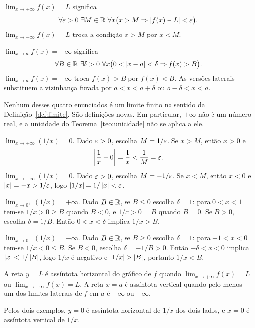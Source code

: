 \documentclass[11pt,a4paper]{article}
\begin{document}
\begin{definicao}
\label{def:infinito}
$\lim_{x\to +\infty}f(x)=L$ significa
\[
\forall\eps>0\ \exists M\in\R\ \forall x\bigl(x>M \Rightarrow \abs{f(x)-L}<\eps\bigr).
\]
$\lim_{x\to -\infty}f(x)=L$ troca a condi\c{c}\~ao $x>M$ por $x<M$.

$\lim_{x\to a}f(x)=+\infty$ significa
\[
\forall B\in\R\ \exists\delta>0\ \forall x\bigl(0<\abs{x-a}<\delta \Rightarrow f(x)>B\bigr).
\]
$\lim_{x\to a}f(x)=-\infty$ troca $f(x)>B$ por $f(x)<B$. As vers\~oes laterais substituem a vizinhan\c{c}a furada por $a<x<a+\delta$ ou $a-\delta<x<a$.
\end{definicao}

Nenhum desses quatro enunciados \'e um limite finito no sentido da Defini\c{c}\~ao~\ref{def:limite}. S\~ao defini\c{c}\~oes novas. Em particular, $+\infty$ n\~ao \'e um n\'umero real, e a unicidade do Teorema~\ref{teo:unicidade} n\~ao se aplica a ele.

\begin{exemplo}
\label{ex:um-sobre-x}
$\lim_{x\to +\infty}(1/x)=0$. Dado $\varepsilon>0$, escolha $M=1/\varepsilon$. Se $x>M$, ent\~ao $x>0$ e
\[
\left\lvert \frac{1}{x}-0 \right\rvert=\frac{1}{x}<\frac{1}{M}=\varepsilon.
\]
$\lim_{x\to -\infty}(1/x)=0$. Dado $\varepsilon>0$, escolha $M=-1/\varepsilon$. Se $x<M$, ent\~ao $x<0$ e $\left\lvert x \right\rvert=-x>1/\varepsilon$, logo $\left\lvert 1/x \right\rvert=1/\left\lvert x \right\rvert<\varepsilon$.
\end{exemplo}

\begin{exemplo}
\label{ex:infinito-lateral}
$\lim_{x\to 0^+}(1/x)=+\infty$. Dado $B\in\mathbb{R}$, se $B\le 0$ escolha $\delta=1$: para $0<x<1$ tem-se $1/x>0\ge B$ quando $B<0$, e $1/x>0=B$ quando $B=0$. Se $B>0$, escolha $\delta=1/B$. Ent\~ao $0<x<\delta$ implica $1/x>B$.

$\lim_{x\to 0^-}(1/x)=-\infty$. Dado $B\in\mathbb{R}$, se $B\ge 0$ escolha $\delta=1$: para $-1<x<0$ tem-se $1/x<0\le B$. Se $B<0$, escolha $\delta=-1/B>0$. Ent\~ao $-\delta<x<0$ implica $\left\lvert x \right\rvert<1/\left\lvert B \right\rvert$, logo $1/x$ \'e negativo e $\left\lvert 1/x \right\rvert>\left\lvert B \right\rvert$, portanto $1/x<B$.
\end{exemplo}

\begin{definicao}
A reta $y=L$ \'e ass\'intota horizontal do gr\'afico de $f$ quando $\lim_{x\to +\infty}f(x)=L$ ou $\lim_{x\to -\infty}f(x)=L$. A reta $x=a$ \'e ass\'intota vertical quando pelo menos um dos limites laterais de $f$ em $a$ \'e $+\infty$ ou $-\infty$.
\end{definicao}

Pelos dois exemplos, $y=0$ \'e ass\'intota horizontal de $1/x$ dos dois lados, e $x=0$ \'e ass\'intota vertical de $1/x$.
\end{document}
